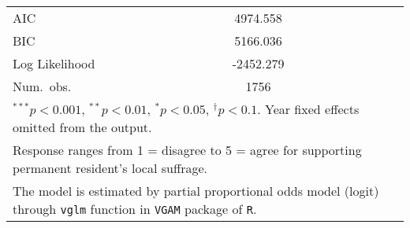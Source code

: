 \begin{table}
\begin{center}
\begin{tabular}{l c c c c }
\midrule
AIC                    & 4974.558       &                    &                    &                \\
BIC                    & 5166.036       &                    &                    &                \\
Log Likelihood         & -2452.279      &                    &                    &                \\
Num.\ obs.             & 1756           &                    &                    &                \\
\bottomrule
\multicolumn{5}{l}{\scriptsize{$^{***}p<0.001$, $^{**}p<0.01$, $^*p<0.05$, $^{\dagger}p<0.1$. Year fixed effects omitted from the output.}} \\ \multicolumn{5}{l}{\scriptsize{Response ranges from 1 = disagree to 5 = agree for supporting permanent resident's local suffrage.}} \\ \multicolumn{5}{l}{\scriptsize{The model is estimated by partial proportional odds model (logit) through \texttt{vglm} function in \texttt{VGAM} package of \texttt{R}.}}
\end{tabular}
\label{goltab_umof}
\end{center}
\end{table}

